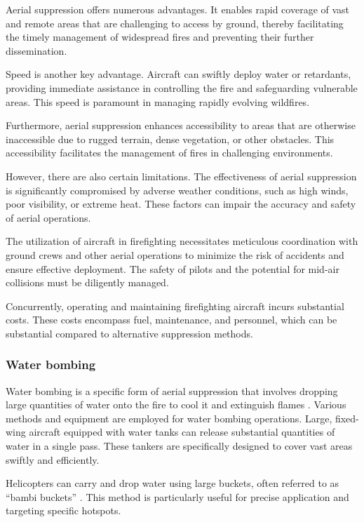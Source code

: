\documentclass[
  12 pt,
]{Nemilov}
\begin{document}
Aerial suppression offers numerous advantages. It enables rapid coverage of vast and remote areas that are challenging to access by ground, thereby facilitating the timely management of widespread fires and preventing their further dissemination.

Speed is another key advantage. Aircraft can swiftly deploy water or retardants, providing immediate assistance in controlling the fire and safeguarding vulnerable areas. This speed is paramount in managing rapidly evolving wildfires.

Furthermore, aerial suppression enhances accessibility to areas that are otherwise inaccessible due to rugged terrain, dense vegetation, or other obstacles. This accessibility facilitates the management of fires in challenging environments.

However, there are also certain limitations. The effectiveness of aerial suppression is significantly compromised by adverse weather conditions, such as high winds, poor visibility, or extreme heat. These factors can impair the accuracy and safety of aerial operations.

The utilization of aircraft in firefighting necessitates meticulous coordination with ground crews and other aerial operations to minimize the risk of accidents and ensure effective deployment. The safety of pilots and the potential for mid-air collisions must be diligently managed.

Concurrently, operating and maintaining firefighting aircraft incurs substantial costs. These costs encompass fuel, maintenance, and personnel, which can be substantial compared to alternative suppression methods.

\subsubsection{Water bombing}\label{water-bombing}

Water bombing is a specific form of aerial suppression that involves dropping large quantities of water onto the fire to cool it and extinguish flames \citep{graham2020extinguishing, underwood2012wildfire}. Various methods and equipment are employed for water bombing operations. Large, fixed-wing aircraft equipped with water tanks can release substantial quantities of water in a single pass. These tankers are specifically designed to cover vast areas swiftly and efficiently.

Helicopters can carry and drop water using large buckets, often referred to as ``bambi buckets'' \citep{kal2019efficiency, matta2020use}. This method is particularly useful for precise application and targeting specific hotspots.
\end{document}
